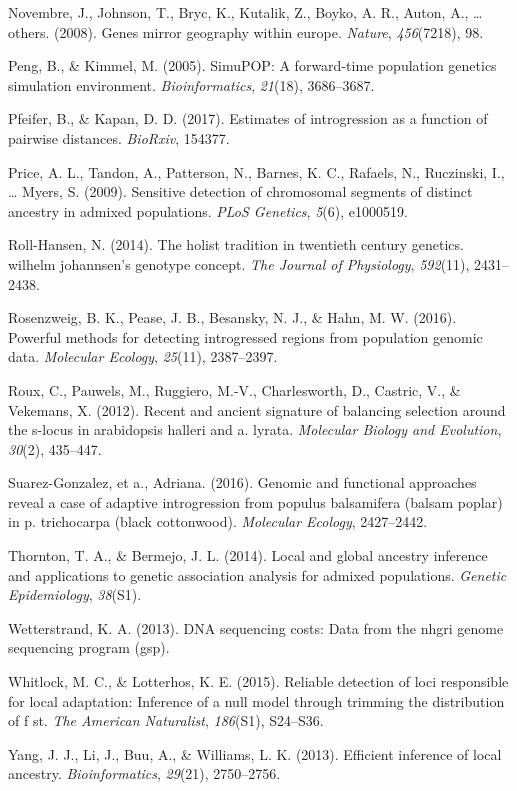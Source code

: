 \documentclass[12pt,twoside]{ugathesis}
\begin{document}
\hypertarget{ref-novembre2008genes}{}
Novembre, J., Johnson, T., Bryc, K., Kutalik, Z., Boyko, A. R., Auton,
A., \ldots{} others. (2008). Genes mirror geography within europe.
\emph{Nature}, \emph{456}(7218), 98.

\hypertarget{ref-peng2005simupop}{}
Peng, B., \& Kimmel, M. (2005). SimuPOP: A forward-time population
genetics simulation environment. \emph{Bioinformatics}, \emph{21}(18),
3686--3687.

\hypertarget{ref-pfeifer2017estimates}{}
Pfeifer, B., \& Kapan, D. D. (2017). Estimates of introgression as a
function of pairwise distances. \emph{BioRxiv}, 154377.

\hypertarget{ref-price2009sensitive}{}
Price, A. L., Tandon, A., Patterson, N., Barnes, K. C., Rafaels, N.,
Ruczinski, I., \ldots{} Myers, S. (2009). Sensitive detection of
chromosomal segments of distinct ancestry in admixed populations.
\emph{PLoS Genetics}, \emph{5}(6), e1000519.

\hypertarget{ref-roll2014holist}{}
Roll-Hansen, N. (2014). The holist tradition in twentieth century
genetics. wilhelm johannsen's genotype concept. \emph{The Journal of
Physiology}, \emph{592}(11), 2431--2438.

\hypertarget{ref-rosenzweig2016powerful}{}
Rosenzweig, B. K., Pease, J. B., Besansky, N. J., \& Hahn, M. W. (2016).
Powerful methods for detecting introgressed regions from population
genomic data. \emph{Molecular Ecology}, \emph{25}(11), 2387--2397.

\hypertarget{ref-roux2012recent}{}
Roux, C., Pauwels, M., Ruggiero, M.-V., Charlesworth, D., Castric, V.,
\& Vekemans, X. (2012). Recent and ancient signature of balancing
selection around the s-locus in arabidopsis halleri and a. lyrata.
\emph{Molecular Biology and Evolution}, \emph{30}(2), 435--447.

\hypertarget{ref-suarez2016}{}
Suarez-Gonzalez, et a., Adriana. (2016). Genomic and functional
approaches reveal a case of adaptive introgression from populus
balsamifera (balsam poplar) in p. trichocarpa (black cottonwood).
\emph{Molecular Ecology}, 2427--2442.

\hypertarget{ref-thornton2014local}{}
Thornton, T. A., \& Bermejo, J. L. (2014). Local and global ancestry
inference and applications to genetic association analysis for admixed
populations. \emph{Genetic Epidemiology}, \emph{38}(S1).

\hypertarget{ref-wetterstrand2013dna}{}
Wetterstrand, K. A. (2013). DNA sequencing costs: Data from the nhgri
genome sequencing program (gsp).

\hypertarget{ref-whitlock2015reliable}{}
Whitlock, M. C., \& Lotterhos, K. E. (2015). Reliable detection of loci
responsible for local adaptation: Inference of a null model through
trimming the distribution of f st. \emph{The American Naturalist},
\emph{186}(S1), S24--S36.

\hypertarget{ref-yang2013efficient}{}
Yang, J. J., Li, J., Buu, A., \& Williams, L. K. (2013). Efficient
inference of local ancestry. \emph{Bioinformatics}, \emph{29}(21),
2750--2756.


\end{document}
